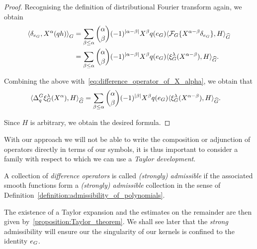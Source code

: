 \begin{proof}
    Recognising the definition of distributional Fourier transform again,
    we obtain
    \begin{align*}
        \dualBracket [\Group] {\delta_{e_\Group}} {\LeftDifferentialOperator \alpha (qh)}
        &=
        \sum_{\beta \leq \alpha} \binom \alpha \beta
        (-1)^{\abs {\alpha - \beta}}
        \LeftDifferentialOperator \beta q(e_\Group)
        \dualBracket [\dualGroup \Group] {\Fourier\{\LeftDifferentialOperator {\alpha - \beta} \delta_{e_\Group}\}} {H}\\
        &=
        \sum_{\beta \leq \alpha} \binom \alpha \beta
        (-1)^{\abs {\alpha - \beta}}
        \LeftDifferentialOperator \beta q(e_\Group)
        \dualBracket [\dualGroup \Group] {\Rep \lambda(\LeftDifferentialOperator {\alpha - \beta})} {H}.
    \end{align*}

    Combining the above with~\eqref{eq:difference_operator_of_X_alpha},
    we obtain that
    \begin{align*}
        \dualBracket [\dualGroup \Group] {\DifferenceOperator q \Rep \lambda (\LeftDifferentialOperator \alpha)} {H}
        &=
        \sum_{\beta \leq \alpha} \binom \alpha \beta
        (-1)^{\abs \beta}
        \LeftDifferentialOperator \beta q(e_\Group)
        \dualBracket [\dualGroup \Group] {\Rep \lambda(\LeftDifferentialOperator {\alpha - \beta})} {H}.
    \end{align*}

    Since $H$ is arbitrary,
    we obtain the desired formula.
\end{proof}

With our approach
we will not be able to write the composition or adjunction of operators directly in terms of our symbols,
it is thus important to consider a family with respect to which we can use a \emph{Taylor development}.

\begin{definition}
\label{definition:admissibility_of_difference_operators}
    A collection of \emph{difference operators} is called \emph{(strongly) admissible}
    if the associated smooth functions form a \emph{(strongly) admissible} collection in the sense of Definition~\ref{definition:admissibility_of_polynomials}.
\end{definition}

The existence of a Taylor expansion and the estimates on the remainder are then given by~\ref{proposition:Taylor_theorem}.
We shall see later that the \emph{strong} admissibility will ensure our the singularity of our kernels is confined to the identity $e_G$.

